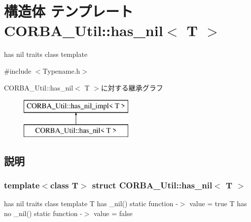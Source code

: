 \section{構造体 テンプレート CORBA\_\-Util::has\_\-nil$<$ T $>$}
\label{structCORBA__Util_1_1has__nil}


has nil traits class template  




{\ttfamily \#include $<$Typename.h$>$}

CORBA\_\-Util::has\_\-nil$<$ T $>$に対する継承グラフ\begin{figure}[H]
\begin{center}
\leavevmode
\includegraphics[height=2cm]{structCORBA__Util_1_1has__nil}
\end{center}
\end{figure}


\subsection{説明}
\subsubsection*{template$<$class T$>$ struct CORBA\_\-Util::has\_\-nil$<$ T $>$}

has nil traits class template T has \_\-nil() static function -\/$>$ value = true T has no \_\-nil() static function -\/$>$ value = false 